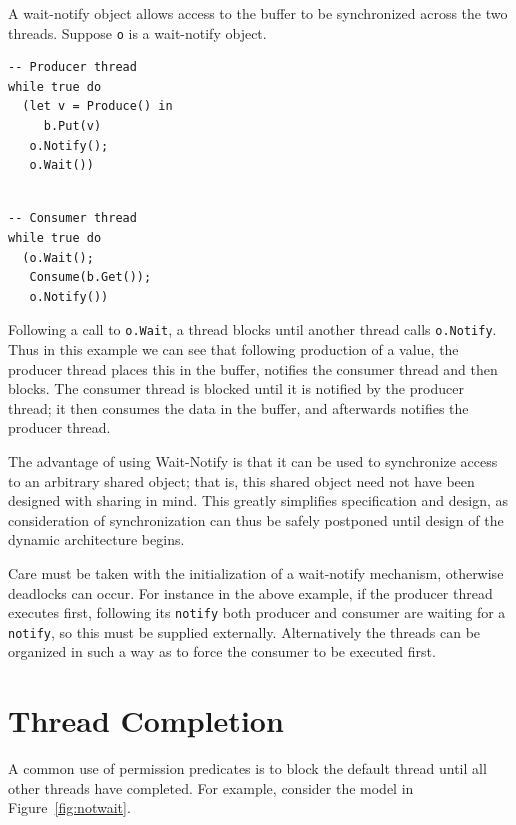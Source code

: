 \documentclass{overturerepchap}
\begin{document}
A wait-notify object allows access to the buffer to be synchronized
across the two threads. Suppose \texttt{o} is a wait-notify object.

\begin{multicols}{2}
\begin{lstlisting}
-- Producer thread
while true do
  (let v = Produce() in
     b.Put(v)
   o.Notify();
   o.Wait())
\end{lstlisting}
\begin{lstlisting}

-- Consumer thread
while true do
  (o.Wait();
   Consume(b.Get());
   o.Notify())
\end{lstlisting}
\end{multicols}

Following a call to \texttt{o.Wait}, a thread blocks until another
thread calls \texttt{o.Notify}. Thus in this example we can see that
following production of a value, the producer thread places this in
the buffer, notifies the consumer thread and then blocks. The consumer
thread is blocked until it is notified by the producer thread; it then
consumes the data in the buffer, and afterwards notifies the producer
thread.

The advantage of using Wait-Notify is that it can be used to
synchronize access to an arbitrary shared object; that is, this shared
object need not have been designed with sharing in mind. This greatly
simplifies specification and design, as consideration of
synchronization can thus be safely postponed until design of the
dynamic architecture begins.

Care must be taken with the initialization of a wait-notify mechanism,
otherwise deadlocks can occur. For instance in the above example, if
the producer thread executes first, following its \texttt{notify} both
producer and consumer are waiting for a \texttt{notify}, so this must
be supplied externally. Alternatively the threads can be organized in
such a way as to force the consumer to be executed first.


\section{Thread Completion}

A common use of permission predicates is to block the default thread
until all other threads have completed. For example, consider the
model in Figure~\ref{fig:notwait}.
\end{document}
